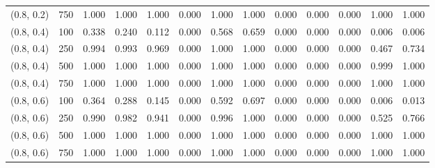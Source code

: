 \begin{table}[ht]
{\begin{tabular}{ll|ccccccccccc}
			(0.8, 0.2) & 750 & 1.000 & 1.000 & 1.000 & 0.000 & 1.000 & 1.000 & 0.000 & 0.000 & 0.000 & 1.000 & 1.000 \\
			(0.8, 0.4) & 100 & 0.338 & 0.240 & 0.112 & 0.000 & 0.568 & 0.659 & 0.000 & 0.000 & 0.000 & 0.006 & 0.006 \\
			(0.8, 0.4) & 250 & 0.994 & 0.993 & 0.969 & 0.000 & 1.000 & 1.000 & 0.000 & 0.000 & 0.000 & 0.467 & 0.734 \\
			(0.8, 0.4) & 500 & 1.000 & 1.000 & 1.000 & 0.000 & 1.000 & 1.000 & 0.000 & 0.000 & 0.000 & 0.999 & 1.000 \\
			(0.8, 0.4) & 750 & 1.000 & 1.000 & 1.000 & 0.000 & 1.000 & 1.000 & 0.000 & 0.000 & 0.000 & 1.000 & 1.000 \\
			(0.8, 0.6) & 100 & 0.364 & 0.288 & 0.145 & 0.000 & 0.592 & 0.697 & 0.000 & 0.000 & 0.000 & 0.006 & 0.013 \\
			(0.8, 0.6) & 250 & 0.990 & 0.982 & 0.941 & 0.000 & 0.996 & 1.000 & 0.000 & 0.000 & 0.000 & 0.525 & 0.766 \\
			(0.8, 0.6) & 500 & 1.000 & 1.000 & 1.000 & 0.000 & 1.000 & 1.000 & 0.000 & 0.000 & 0.000 & 1.000 & 1.000 \\
			(0.8, 0.6) & 750 & 1.000 & 1.000 & 1.000 & 0.000 & 1.000 & 1.000 & 0.000 & 0.000 & 0.000 & 1.000 & 1.000 \\
			\hline
		\end{tabular}
		
	}
\end{table}



